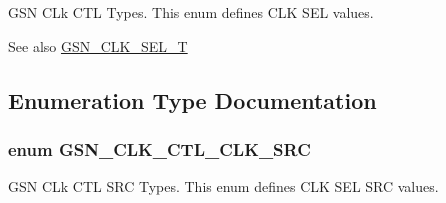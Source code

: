 GSN CLk CTL Types. This enum defines CLK SEL values. 

\begin{DoxySeeAlso}{See also}
\hyperlink{a00644_gaf4925c33b2dac850008f7d4463760580}{GSN\_\-CLK\_\-SEL\_\-T} 
\end{DoxySeeAlso}


\subsection{Enumeration Type Documentation}
\hypertarget{a00644_ga53f0e57a2fa30eef772141f9ac772202}{
\subsubsection[{GSN\_\-CLK\_\-CTL\_\-CLK\_\-SRC}]{\setlength{\rightskip}{0pt plus 5cm}enum {\bf GSN\_\-CLK\_\-CTL\_\-CLK\_\-SRC}}}
\label{a00644_ga53f0e57a2fa30eef772141f9ac772202}


GSN CLk CTL SRC Types. This enum defines CLK SEL SRC values. 

